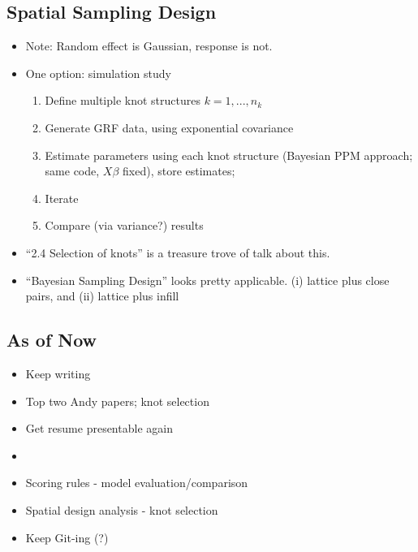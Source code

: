 \documentclass{article}
\begin{document}
\subsection*{Spatial Sampling Design}
\begin{itemize}
\item Note: Random effect is Gaussian, response is not.
\item One option: simulation study
  \begin{enumerate}
  \item Define multiple knot structures $k = 1,...,n_{k}$
  \item Generate GRF data, using exponential covariance
  \item Estimate parameters using each knot structure (Bayesian PPM approach; same code, $X\beta$ fixed), store estimates; 
  \item Iterate
  \item Compare (via variance?) results
  \end{enumerate}
\item ``2.4 Selection of knots'' \citep{Banerjee2008} is a treasure trove of talk about this.
\item ``Bayesian Sampling Design'' \citep{Diggle2006} looks pretty applicable. (i) lattice plus close pairs, and (ii) lattice plus infill
\end{itemize}

\subsection*{As of Now}
\begin{itemize}
\item Keep writing
\item Top two Andy papers; knot selection
\item Get resume presentable again \checkmark
\item 
\item Scoring rules - model evaluation/comparison
\item Spatial design analysis - knot selection
\item Keep Git-ing (?)
\end{itemize}
\end{document}
